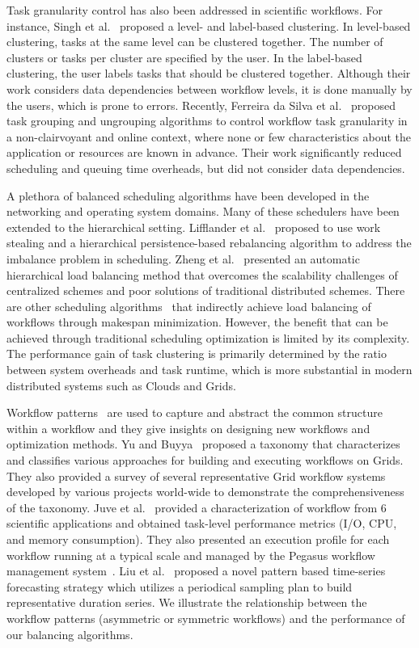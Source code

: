 \documentclass[final,5p,times,twocolumn]{elsarticle}
\begin{document}
Task granularity control has also been addressed in scientific workflows. For instance, Singh et al.~\cite{Singh:2008:WTC:1341811.1341822} proposed a level- and label-based clustering. In level-based clustering, tasks at the same level can be clustered together. The number of clusters or tasks per cluster are specified by the user. In the label-based clustering, the user labels tasks that should be clustered together. Although their work considers data dependencies between workflow levels, it is done manually by the users, which is prone to errors. Recently, Ferreira da Silva et al.~\cite{Ferreira-granularity-2013,FerreiradaSilva-CCPE-2014} proposed task grouping and ungrouping algorithms to control workflow task granularity in a non-clairvoyant and online context, where none or few characteristics about the application or resources are known in advance. Their work significantly reduced scheduling and queuing time overheads, but did not consider data dependencies.

A plethora of balanced scheduling algorithms have been developed in the networking and operating system domains. Many of these schedulers have been extended to the hierarchical setting. Lifflander et al.~\cite{Lifflander} proposed to use work stealing and a hierarchical persistence-based rebalancing algorithm to address the imbalance problem in scheduling. Zheng et al.~\cite{Zheng} presented an automatic hierarchical load balancing method that overcomes the scalability challenges of centralized schemes and poor solutions of traditional distributed schemes. There are other scheduling algorithms~\cite{rizos2008} that indirectly achieve load balancing of workflows through makespan minimization. However, the benefit that can be achieved through traditional scheduling optimization is limited by its complexity. The performance gain of task clustering is primarily determined by the ratio between system overheads and task runtime, which is more substantial in modern distributed systems such as Clouds and Grids. 

Workflow patterns~\cite{Yu2005, Juve2013, Liu2008} are used to capture and abstract the common structure within a workflow and they give insights on designing new workflows and optimization methods. Yu and Buyya~\cite{Yu2005} proposed a taxonomy that characterizes and classifies various approaches for building and executing workflows on Grids. They also provided a survey of several representative Grid workflow systems developed by various projects world-wide to demonstrate the comprehensiveness of the taxonomy. Juve et al.~\cite{Juve2013} provided a characterization of workflow from 6 scientific applications and obtained task-level performance metrics (I/O, CPU, and memory consumption). They also presented an execution profile for each workflow running at a typical scale and managed by the Pegasus workflow management system~\cite{Deelman2004}. Liu et al.~\cite{Liu2008} proposed a novel pattern based time-series forecasting strategy which utilizes a periodical sampling plan to build representative duration series. We illustrate the relationship between the workflow patterns (asymmetric or symmetric workflows) and the performance of our balancing algorithms. 
\end{document}
